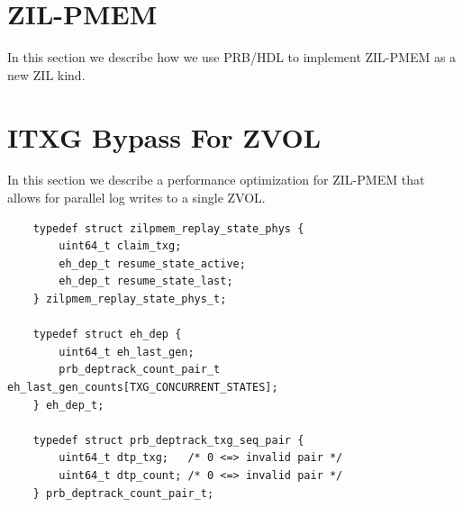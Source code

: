 \documentclass[12pt,a4paper,twoside]{book}
\begin{document}

\section{ZIL-PMEM}\label{sec:zilpmem}
In this section we describe how we use PRB/HDL to implement ZIL-PMEM as a new ZIL kind.

\section{ITXG Bypass For ZVOL}\label{sec:itxgbypass}
In this section we describe a performance optimization for ZIL-PMEM that allows for parallel log writes to a single ZVOL.



\begin{lstlisting}
    typedef struct zilpmem_replay_state_phys {
        uint64_t claim_txg;
        eh_dep_t resume_state_active;
        eh_dep_t resume_state_last;
    } zilpmem_replay_state_phys_t;
    
    typedef struct eh_dep {
        uint64_t eh_last_gen;
        prb_deptrack_count_pair_t eh_last_gen_counts[TXG_CONCURRENT_STATES];
    } eh_dep_t;
    
    typedef struct prb_deptrack_txg_seq_pair {
        uint64_t dtp_txg;	/* 0 <=> invalid pair */
        uint64_t dtp_count;	/* 0 <=> invalid pair */
    } prb_deptrack_count_pair_t;
    \end{lstlisting}
    
\end{document}
